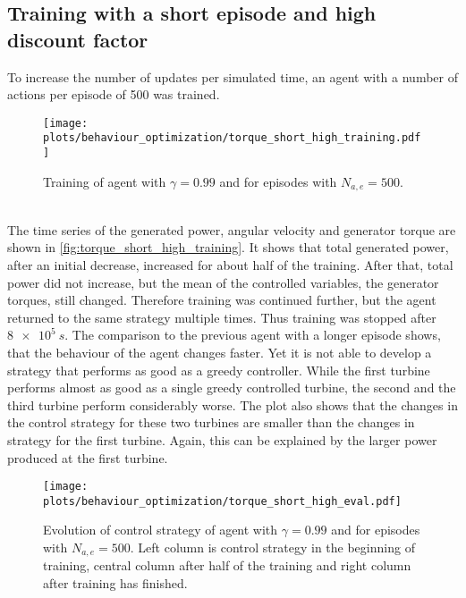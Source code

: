\subsection{Training with a short episode and high discount factor}
To increase the number of updates per simulated time, an agent with a number of actions per episode of 500 was trained.  
\begin{figure}[h]
	\centering
	\texttt{[image: plots/behaviour\_optimization/torque\_short\_high\_training.pdf]}
	\caption{Training of agent with $\gamma=0.99$ and for episodes with $N_{a,e}=500$.}
	\label{fig:torque_short_high_training}
\end{figure}\\
The time series of the generated power, angular velocity and generator torque are shown in \autoref{fig:torque_short_high_training}. It shows that total generated power, after an initial decrease, increased for about half of the training. After that, total power did not increase, but the mean of the controlled variables, the generator torques, still changed. Therefore training was continued further, but the agent returned to the same strategy multiple times. Thus training was stopped after $\SI{8e5}{s}$. The comparison to the previous agent with a longer episode shows, that the behaviour of the agent changes faster. Yet it is not able to develop a strategy that performs as good as a greedy controller. While the first turbine performs almost as good as a single greedy controlled turbine, the second and the third turbine perform considerably worse. The plot also shows that the changes in the control strategy for these two turbines are smaller than the changes in strategy for the first turbine. Again, this can be explained by the larger power produced at the first turbine. 
\begin{figure}[h]
	\centering
	\texttt{[image: plots/behaviour\_optimization/torque\_short\_high\_eval.pdf]}
	\caption{Evolution of control strategy of agent with $\gamma=0.99$ and for episodes with $N_{a,e}=500$. Left column is control strategy in the beginning of training, central column after half of the training and right column after training has finished.}
	\label{fig:torque_short_high_eval}
\end{figure}
